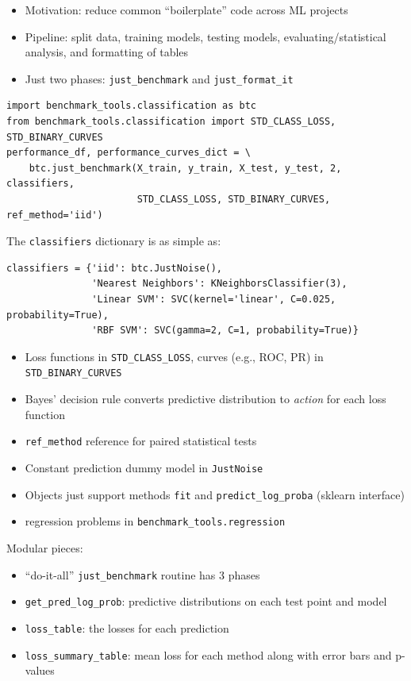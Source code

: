 \documentclass[a0,landscape]{a0poster}
\newcommand{\code}{\texttt}
\begin{document}
\begin{multicols}{3}
\begin{itemize}
  \item Motivation: reduce common ``boilerplate'' code across ML projects
  \item Pipeline: split data, training models, testing models, evaluating/statistical analysis, and formatting of tables
  \item Just two phases: \code{just\_benchmark} and \code{just\_format\_it}
\end{itemize}
%
\begin{verbatim}
import benchmark_tools.classification as btc
from benchmark_tools.classification import STD_CLASS_LOSS, STD_BINARY_CURVES
performance_df, performance_curves_dict = \
    btc.just_benchmark(X_train, y_train, X_test, y_test, 2, classifiers,
                       STD_CLASS_LOSS, STD_BINARY_CURVES, ref_method='iid')
\end{verbatim}
The \code{classifiers} dictionary is as simple as:
\vspace{-2mm}
\begin{verbatim}
classifiers = {'iid': btc.JustNoise(),
               'Nearest Neighbors': KNeighborsClassifier(3),
               'Linear SVM': SVC(kernel='linear', C=0.025, probability=True),
               'RBF SVM': SVC(gamma=2, C=1, probability=True)}
\end{verbatim}
%
\begin{itemize}
  \item Loss functions in \code{STD\_CLASS\_LOSS}, curves (e.g., ROC, PR) in \code{STD\_BINARY\_CURVES}
  \item Bayes' decision rule converts predictive distribution to \emph{action} for each loss function
  \item \code{ref\_method} reference for paired statistical tests
  \item Constant prediction dummy model in \code{JustNoise}
  \item Objects just support methods \code{fit} and \code{predict\_log\_proba} (sklearn interface)
  \item regression problems in \code{benchmark\_tools.regression}
\end{itemize}

Modular pieces:
\begin{itemize}
  \item ``do-it-all'' \code{just\_benchmark} routine has 3 phases
  \item \code{get\_pred\_log\_prob}: predictive distributions on each test point and model
  \item \code{loss\_table}: the losses for each prediction
  \item \code{loss\_summary\_table}: mean loss for each method along with error bars and p-values
\end{itemize}


\end{multicols}
\end{document}
